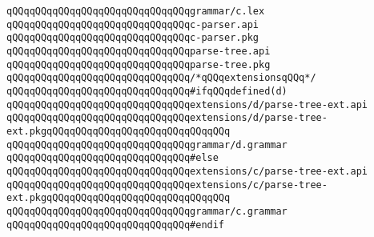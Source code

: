 \verb|qQQqqQQqqQQqqQQqqQQqqQQqqQQqqQQqgrammar/c.lex|\newline
\newline
\verb|qQQqqQQqqQQqqQQqqQQqqQQqqQQqqQQqc-parser.api|\newline
\verb|qQQqqQQqqQQqqQQqqQQqqQQqqQQqqQQqc-parser.pkg|\newline
\verb|qQQqqQQqqQQqqQQqqQQqqQQqqQQqqQQqparse-tree.api|\newline
\verb|qQQqqQQqqQQqqQQqqQQqqQQqqQQqqQQqparse-tree.pkg|\newline
\newline
\verb|qQQqqQQqqQQqqQQqqQQqqQQqqQQqqQQq/*qQQqextensionsqQQq*/|\newline
\verb|qQQqqQQqqQQqqQQqqQQqqQQqqQQqqQQq#ifqQQqdefined(d)|\newline
\verb|qQQqqQQqqQQqqQQqqQQqqQQqqQQqqQQqextensions/d/parse-tree-ext.api|\newline
\verb|qQQqqQQqqQQqqQQqqQQqqQQqqQQqqQQqextensions/d/parse-tree-ext.pkgqQQqqQQqqQQqqQQqqQQqqQQqqQQqqQQq|\newline
\verb|qQQqqQQqqQQqqQQqqQQqqQQqqQQqqQQqgrammar/d.grammar|\newline
\verb|qQQqqQQqqQQqqQQqqQQqqQQqqQQqqQQq#else|\newline
\verb|qQQqqQQqqQQqqQQqqQQqqQQqqQQqqQQqextensions/c/parse-tree-ext.api|\newline
\verb|qQQqqQQqqQQqqQQqqQQqqQQqqQQqqQQqextensions/c/parse-tree-ext.pkgqQQqqQQqqQQqqQQqqQQqqQQqqQQqqQQq|\newline
\verb|qQQqqQQqqQQqqQQqqQQqqQQqqQQqqQQqgrammar/c.grammar|\newline
\verb|qQQqqQQqqQQqqQQqqQQqqQQqqQQqqQQq#endif|\newline

